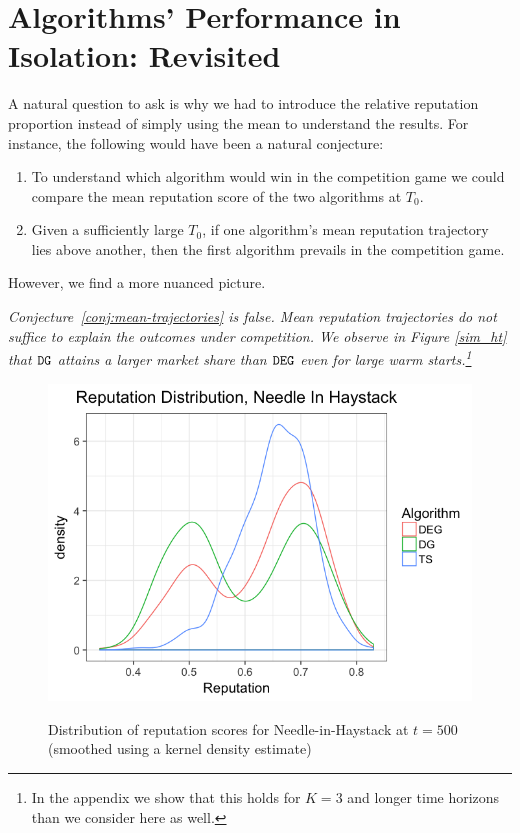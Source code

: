 \documentclass[../competing_bandits.tex]{subfiles}
\begin{document}
\section{Algorithms' Performance in Isolation: Revisited}\label{section:revisited}

A natural question to ask is why we had to introduce the relative reputation proportion instead of simply using the mean to understand the results. For instance, the following would have been a natural conjecture:
\begin{conjecture}\label{conj:mean-trajectories}
\begin{enumerate}
\item To understand which algorithm would win in the competition game we could compare the mean reputation score of the two algorithms at $T_0$.
\item Given a sufficiently large $T_0$, if one algorithm's mean reputation trajectory lies above another, then the first algorithm prevails in the competition game.
\end{enumerate}
\end{conjecture}

However, we find a more nuanced picture. 

\begin{finding}
\textit{
Conjecture~\ref{conj:mean-trajectories} is false. Mean reputation trajectories do not suffice to explain the outcomes under competition. We observe in Figure \ref{sim_ht} that $\mathtt{DG}$ attains a larger market share than $\mathtt{DEG}$ even for large warm starts.\footnote{In the appendix we show that this holds for $K = 3$ and longer time horizons than we consider here as well.}}
\end{finding}

\begin{figure}[ht]
\caption{Distribution of reputation scores for Needle-in-Haystack at $t=500$ (smoothed using a kernel density estimate)}
\includegraphics[scale=0.35]{figures/rep_distribution_nih}
\label{rep_dist_nih}
\end{figure}
\end{document}
